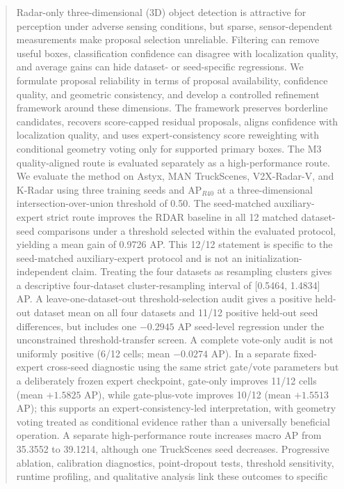 \documentclass[preprint,12pt,times]{elsarticle}
\begin{document}
\begin{frontmatter}
\begin{abstract}
Radar-only three-dimensional (3D) object detection is attractive for perception
under adverse sensing conditions, but sparse, sensor-dependent measurements make proposal
selection unreliable. Filtering can remove useful boxes, classification
confidence can disagree with localization quality, and average gains can hide
dataset- or seed-specific regressions. We formulate proposal reliability in
terms of proposal availability, confidence quality, and geometric consistency,
and develop a controlled refinement framework around these dimensions. The
framework preserves borderline candidates, recovers score-capped residual
proposals, aligns confidence with localization quality, and uses expert-consistency
score reweighting with conditional geometry voting only for supported primary boxes.
The M3 quality-aligned route is evaluated separately as a high-performance route.
We evaluate the method on
Astyx, MAN TruckScenes,
V2X-Radar-V, and K-Radar using three training seeds and AP$_{R40}$ at a
three-dimensional intersection-over-union threshold of 0.50. The seed-matched
auxiliary-expert strict route improves the RDAR baseline in all 12 matched dataset-seed
comparisons under a threshold selected within the evaluated protocol, yielding
a mean gain of 0.9726 AP. This 12/12 statement is specific to the
seed-matched auxiliary-expert protocol and is not an initialization-independent
claim. Treating the four datasets as resampling clusters gives a
descriptive four-dataset cluster-resampling interval of [0.5464, 1.4834] AP.
A leave-one-dataset-out threshold-selection audit gives a positive held-out
dataset mean on all four datasets and 11/12 positive held-out seed
differences, but includes one $-0.2945$ AP seed-level regression under the
unconstrained threshold-transfer screen. A complete vote-only audit is not
uniformly positive (6/12 cells; mean $-0.0274$ AP). In a separate fixed-expert
cross-seed diagnostic using the same strict gate/vote parameters but a
deliberately frozen expert checkpoint, gate-only improves 11/12
cells (mean $+1.5825$ AP), while gate-plus-vote improves 10/12 (mean
$+1.5513$ AP); this supports an expert-consistency-led interpretation, with
geometry voting treated as conditional evidence rather than a universally
beneficial operation. A separate high-performance route increases macro
AP from 35.3552 to 39.1214, although one TruckScenes seed decreases. Progressive
ablation, calibration diagnostics, point-dropout tests, threshold sensitivity,
runtime profiling, and qualitative analysis link these outcomes to specific

\end{abstract}
\end{frontmatter}
\end{document}
